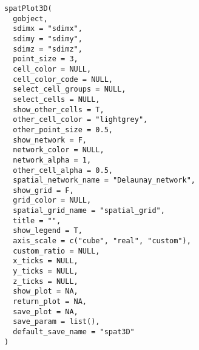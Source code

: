 \documentclass[a4paper]{book}
\begin{document}
\begin{Usage}
\begin{verbatim}
spatPlot3D(
  gobject,
  sdimx = "sdimx",
  sdimy = "sdimy",
  sdimz = "sdimz",
  point_size = 3,
  cell_color = NULL,
  cell_color_code = NULL,
  select_cell_groups = NULL,
  select_cells = NULL,
  show_other_cells = T,
  other_cell_color = "lightgrey",
  other_point_size = 0.5,
  show_network = F,
  network_color = NULL,
  network_alpha = 1,
  other_cell_alpha = 0.5,
  spatial_network_name = "Delaunay_network",
  show_grid = F,
  grid_color = NULL,
  spatial_grid_name = "spatial_grid",
  title = "",
  show_legend = T,
  axis_scale = c("cube", "real", "custom"),
  custom_ratio = NULL,
  x_ticks = NULL,
  y_ticks = NULL,
  z_ticks = NULL,
  show_plot = NA,
  return_plot = NA,
  save_plot = NA,
  save_param = list(),
  default_save_name = "spat3D"
)
\end{verbatim}
\end{Usage}
%
\end{document}
